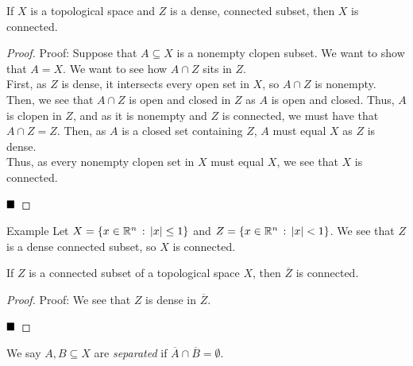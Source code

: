 
\begin{lemma}
    If $X$ is a topological space and $Z$ is a dense, connected subset, then $X$ is connected. 
\end{lemma}
\begin{proof}{Proof:}
    Suppose that $A \subseteq X$ is a nonempty clopen subset. We want to show that $A = X$. We want to see how $A \cap Z$ sits in $Z$.\\

    First, as $Z$ is dense, it intersects every open set in $X$, so $A \cap Z$ is nonempty. Then, we see that $A \cap Z$ is open and closed in $Z$ as $A$ is open and closed. Thus, $A$ is clopen in $Z$, and as it is nonempty and $Z$ is connected, we must have that $A \cap Z = Z$. Then, as $A$ is a closed set containing $Z$, $A$ must equal $X$ as $Z$ is dense.\\

    Thus, as every nonempty clopen set in $X$ must equal $X$, we see that $X$ is connected.

    $\qed$
\end{proof}



\begin{example}{Example}
    Let $X = \{x \in \mathbb{R}^n \, :\, \left\lvert {x} \right\rvert \leq 1\}$ and $Z = \{x \in \mathbb{R}^n \, :\, \left\lvert {x} \right\rvert < 1\}$. We see that $Z$ is a dense connected subset, so $X$ is connected. 
\end{example}

\begin{lemma}
    If $Z$ is a connected subset of a topological space $X$, then $\overline{Z}$ is connected. 
\end{lemma}
\begin{proof}{Proof:}
    We see that $Z$ is dense in $\overline{Z}$. 

    $\qed$
\end{proof}

\begin{definition}
    We say $A, B \subseteq X$ are \emph{separated} if $\overline{A} \cap \overline{B} = \emptyset$. 
\end{definition}


